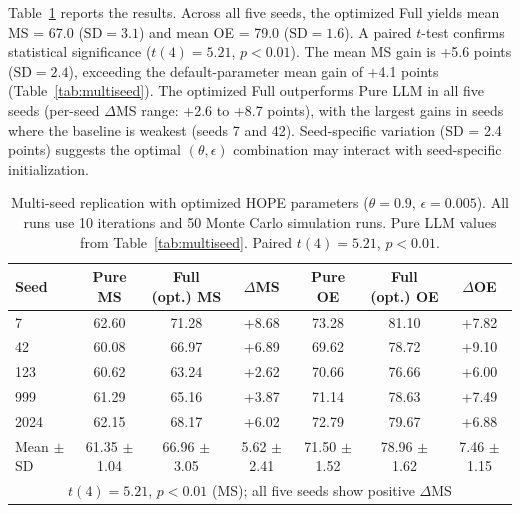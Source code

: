 Table~\ref{tab:multiseed-optimized} reports the results. Across all five seeds, the optimized Full yields mean MS = 67.0 ($\text{SD}=3.1$) and mean OE = 79.0 ($\text{SD}=1.6$). A paired $t$-test confirms statistical significance ($t(4)=5.21$, $p<0.01$). The mean MS gain is +5.6 points ($\text{SD}=2.4$), exceeding the default-parameter mean gain of +4.1 points (Table~\ref{tab:multiseed}). The optimized Full outperforms Pure LLM in all five seeds (per-seed $\Delta$MS range: +2.6 to +8.7 points), with the largest gains in seeds where the baseline is weakest (seeds 7 and 42). Seed-specific variation (SD = 2.4 points) suggests the optimal $(\theta,\epsilon)$ combination may interact with seed-specific initialization.

\clearpage
\begin{table}[!htbp]
\centering
\caption{Multi-seed replication with optimized HOPE parameters ($\theta=0.9$, $\epsilon=0.005$). All runs use 10 iterations and 50 Monte Carlo simulation runs. Pure LLM values from Table~\ref{tab:multiseed}. Paired $t(4)=5.21$, $p<0.01$.}
\label{tab:multiseed-optimized}
\footnotesize
\setlength{\tabcolsep}{2.2pt}
\begin{tabular}{lcccccc}
\toprule
Seed & Pure MS & Full (opt.) MS & $\Delta$MS & Pure OE & Full (opt.) OE & $\Delta$OE \\
\midrule
7 & 62.60 & 71.28 & +8.68 & 73.28 & 81.10 & +7.82 \\
42 & 60.08 & 66.97 & +6.89 & 69.62 & 78.72 & +9.10 \\
123 & 60.62 & 63.24 & +2.62 & 70.66 & 76.66 & +6.00 \\
999 & 61.29 & 65.16 & +3.87 & 71.14 & 78.63 & +7.49 \\
2024 & 62.15 & 68.17 & +6.02 & 72.79 & 79.67 & +6.88 \\
\midrule
Mean $\pm$ SD & \shortstack{61.35\\$\pm$1.04} & \shortstack{66.96\\$\pm$3.05} & \shortstack{5.62\\$\pm$2.41} & \shortstack{71.50\\$\pm$1.52} & \shortstack{78.96\\$\pm$1.62} & \shortstack{7.46\\$\pm$1.15} \\
\bottomrule
\multicolumn{7}{c}{\footnotesize $t(4)=5.21$, $p<0.01$ (MS); all five seeds show positive $\Delta$MS} \\
\bottomrule
\end{tabular}
\end{table}

